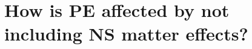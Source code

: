 \documentclass[aps,prd,amsmath,floats,floatfix, twocolumn,
superscriptaddress,nofootinbib,showpacs]{revtex4-1}
\newcommand{\chibh}{\chi_\mathrm{BH}}
\newcommand{\mbh}{m_\mathrm{BH}}
\newcommand{\mns}{m_\mathrm{NS}}
\begin{document}
%
%
%
%
%

\section{How is PE affected by not including NS matter effects?}
\end{document}
